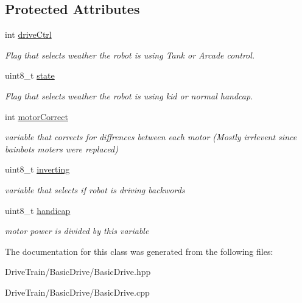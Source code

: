 \subsection*{Protected Attributes}
\begin{DoxyCompactItemize}
\item 
\mbox{\label{classbasic_drive_controller_a1f5b541fbb162a089417a9f0c5fb021a}} 
int \mbox{\hyperlink{classbasic_drive_controller_a1f5b541fbb162a089417a9f0c5fb021a}{drive\+Ctrl}}
\begin{DoxyCompactList}\small\item\em Flag that selects weather the robot is using Tank or Arcade control. \end{DoxyCompactList}\item 
\mbox{\label{classbasic_drive_controller_a827b57c7cb2ee0cc95bcde4609c86fdb}} 
uint8\+\_\+t \mbox{\hyperlink{classbasic_drive_controller_a827b57c7cb2ee0cc95bcde4609c86fdb}{state}}
\begin{DoxyCompactList}\small\item\em Flag that selects weather the robot is using kid or normal handcap. \end{DoxyCompactList}\item 
\mbox{\label{classbasic_drive_controller_a33c2117a4c1d8ddf201a259c02aef089}} 
int \mbox{\hyperlink{classbasic_drive_controller_a33c2117a4c1d8ddf201a259c02aef089}{motor\+Correct}}
\begin{DoxyCompactList}\small\item\em variable that corrects for diffrences between each motor (Mostly irrlevent since bainbots moters were replaced) \end{DoxyCompactList}\item 
\mbox{\label{classbasic_drive_controller_a4af5df5163a52a0f9cbeabd07c7fa933}} 
uint8\+\_\+t \mbox{\hyperlink{classbasic_drive_controller_a4af5df5163a52a0f9cbeabd07c7fa933}{inverting}}
\begin{DoxyCompactList}\small\item\em variable that selects if robot is driving backwords \end{DoxyCompactList}\item 
\mbox{\label{classbasic_drive_controller_a1eab55792c4bb250dd38cda937bd8285}} 
uint8\+\_\+t \mbox{\hyperlink{classbasic_drive_controller_a1eab55792c4bb250dd38cda937bd8285}{handicap}}
\begin{DoxyCompactList}\small\item\em motor power is divided by this variable \end{DoxyCompactList}\end{DoxyCompactItemize}


The documentation for this class was generated from the following files\+:\begin{DoxyCompactItemize}
\item 
Drive\+Train/\+Basic\+Drive/Basic\+Drive.\+hpp\item 
Drive\+Train/\+Basic\+Drive/Basic\+Drive.\+cpp\end{DoxyCompactItemize}
